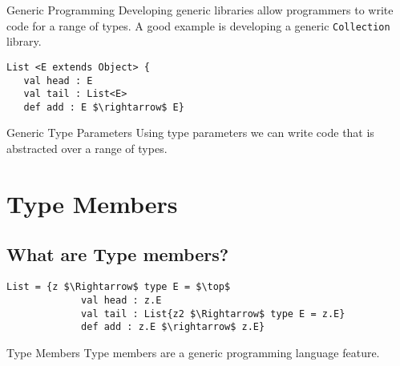 \documentclass[dvipsnames]{beamer}
\begin{document}

\begin{frame}{Generic Programming}
Developing generic libraries allow programmers to write code for a range of types. A good example is developing a generic \texttt{Collection} library.
\end{frame}

\begin{lrbox}{\tpExList}
\begin{lstlisting}[mathescape, style=customlang]
List <E extends Object> {
   val head : E
   val tail : List<E>
   def add : E $\rightarrow$ E}
\end{lstlisting}
\end{lrbox}

\begin{frame}{Generic Type Parameters}
Using type parameters we can write code that is abstracted over a range of types.
\begin{example}
\usebox{\tpExList}
\end{example}
\end{frame}

\section{Type Members}

\subsection{What are Type members?}

\begin{lrbox}{\tmExList}
\begin{lstlisting}[mathescape, style=customlang]
List = {z $\Rightarrow$ type E = $\top$
             val head : z.E
             val tail : List{z2 $\Rightarrow$ type E = z.E}
             def add : z.E $\rightarrow$ z.E}
\end{lstlisting}
\end{lrbox}

\begin{frame}{Type Members}
Type members are a generic programming language feature.
\begin{example}
\usebox{\tmExList}
\end{example}
\end{frame}
\end{document}
